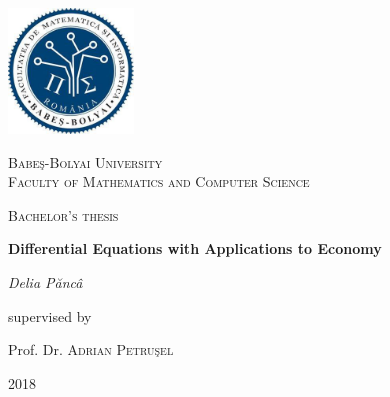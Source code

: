 \documentclass[a4paper,11pt]{report}
\newcommand\blankpage{%
    \null
    \thispagestyle{empty}%
    \addtocounter{page}{-1}%
    \newpage}
\begin{document}
 \begin{titlepage}
	\centering
	\includegraphics[width=0.25\textwidth]{Facultate1.jpg}\par\vspace{1cm}
	{\scshape\LARGE Babe\c{s}-Bolyai University \\ Faculty of Mathematics and Computer Science \par}
	\vspace{1cm}
	{\scshape\Large Bachelor's thesis\par}
	\vspace{1.5cm}
	{\huge\bfseries Differential Equations with Applications to Economy\par}
	\vspace{2cm}
	{\Large\itshape Delia P\u{a}nc\^{a}\par}
	\vfill
	supervised by\par
	Prof. Dr.  \textsc{Adrian Petru\c{s}el}

	\vfill

	{2018}
\end{titlepage}
 \tableofcontents
 \blankpage
\end{document}
